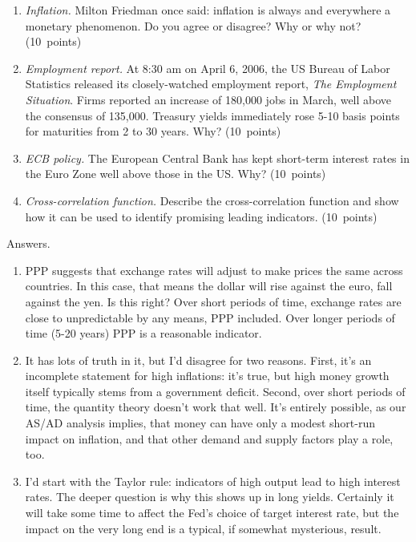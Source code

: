 \documentclass[letterpaper,12pt]{article}
\begin{document}
\begin{enumerate}
\begin{enumerate}
\item {\it Inflation.\/}
Milton Friedman once said:  inflation is always and everywhere a monetary phenomenon. 
Do you agree or disagree?  Why or why not?  (10~points)

\item {\it Employment report.\/} 
At 8:30 am on April 6, 2006, 
the US Bureau of Labor Statistics released
its closely-watched employment report, {\it The Employment Situation\/}.
Firms reported an increase of 180,000 jobs in March, 
well above the consensus of 135,000.  
Treasury yields immediately rose 5-10 basis points 
for maturities from 2 to 30 years.  
Why?  
(10~points)

\item {\it ECB policy.\/}
The European Central Bank has kept short-term interest rates
in the Euro Zone well above those in the US.
Why?  (10~points)

\item {\it Cross-correlation function.\/}
Describe the cross-correlation function and show how it can 
be used to identify promising leading indicators.
(10~points) 

\end{enumerate}

Answers.
\begin{enumerate}

\item   PPP suggests that exchange rates will adjust to make prices the same across countries. In
this case, that means the dollar will rise against the euro, fall against the yen.  Is this right?
Over short periods of time, exchange rates are close to unpredictable by any means, PPP included.
Over longer periods of time (5-20 years) PPP is a reasonable indicator.  

\item It has lots of truth in it, but I'd disagree for two reasons. 
First, it's an incomplete statement for high inflations: 
it's true, but high money growth itself typically stems from 
a government deficit.
Second, over short periods of time, the quantity theory doesn't work 
that well.  
It's entirely possible, as our AS/AD analysis implies, that 
money can have only a modest short-run impact on inflation, 
and that other demand and supply factors play a role, too.  

\item  I'd start with the Taylor rule:  indicators of high output 
lead to high interest rates.
The deeper question is why this shows up in long yields.
Certainly it will take some time to affect the Fed's choice of 
target interest rate, but the impact on the very long end is a 
typical, if somewhat mysterious, result.  


\end{enumerate}
\end{enumerate}
\end{document}
